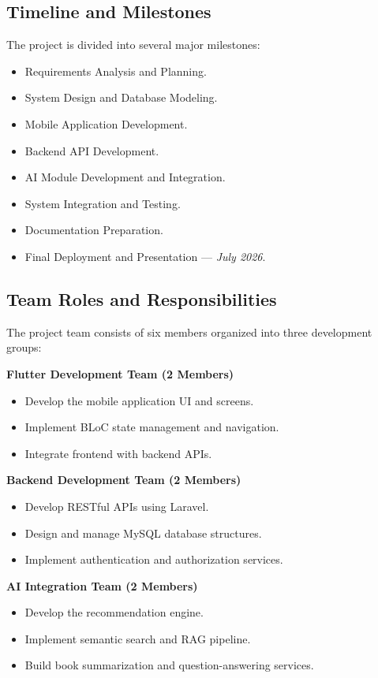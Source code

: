 \subsection{Timeline and Milestones}

The project is divided into several major milestones:

\begin{itemize}
  \item Requirements Analysis and Planning.
  \item System Design and Database Modeling.
  \item Mobile Application Development.
  \item Backend API Development.
  \item AI Module Development and Integration.
  \item System Integration and Testing.
  \item Documentation Preparation.
  \item Final Deployment and Presentation --- \textit{July 2026}.
\end{itemize}

\subsection{Team Roles and Responsibilities}

The project team consists of six members organized into three development
groups:

\textbf{Flutter Development Team (2 Members)}
\begin{itemize}
  \item Develop the mobile application UI and screens.
  \item Implement BLoC state management and navigation.
  \item Integrate frontend with backend APIs.
\end{itemize}

\textbf{Backend Development Team (2 Members)}
\begin{itemize}
  \item Develop RESTful APIs using Laravel.
  \item Design and manage MySQL database structures.
  \item Implement authentication and authorization services.
\end{itemize}

\textbf{AI Integration Team (2 Members)}
\begin{itemize}
  \item Develop the recommendation engine.
  \item Implement semantic search and RAG pipeline.
  \item Build book summarization and question-answering services.
\end{itemize}

